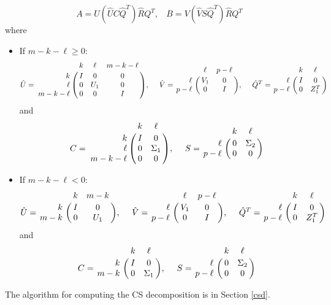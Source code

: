 \begin{equation} \label{eq-alg-4}
A = U(\hat{U}C\hat{Q}^{T})\hat{R}Q^{T}, \ \ \ \ 
B = V(\hat{V}S\hat{Q}^{T})\hat{R}Q^{T}
\end{equation}
where
\begin{itemize}
\item If $m-k-\ell \geq 0$:
	\[
                \hat{U} = \bordermatrix{ & k & \ell & m-k-\ell\cr
                \hfill k & I & 0 & 0\cr
                \hfill \ell & 0 & U_1 & 0\cr
                \hfill m-k-\ell & 0 & 0 & I}, \  \ \ \
                \hat{V} = \bordermatrix{ & \ell & p-\ell   \cr
                \hfill \ell & V_1 & 0\cr
                \hfill p-\ell & 0 & I}, \ \ \ \
                \hat{Q}^{T} = \bordermatrix{ & k & \ell   \cr
                \hfill \ell & I & 0\cr
                \hfill p-\ell & 0 & Z_1^{T}}
     \]
     and 
     \[
                C = \bordermatrix{ & k & \ell \cr
                \hfill k & I & 0 \cr
                \hfill \ell & 0 & \Sigma_{1} \cr
                \hfill m-k-\ell & 0 & 0}, \  \ \ \
                S = \bordermatrix{ & k & \ell   \cr
                \hfill \ell & 0 & \Sigma_{2}\cr
                \hfill p-\ell & 0 & 0}
    \]
\item If $m-k-\ell < 0$:
	\[
                \hat{U} = \bordermatrix{ & k & m-k \cr
                \hfill k & I & 0 \cr
                \hfill m-k & 0 & U_1}, \  \ \ \
                \hat{V} = \bordermatrix{ & \ell & p-\ell   \cr
                \hfill \ell & V_1 & 0\cr
                \hfill p-\ell & 0 & I}, \ \ \ \
                \hat{Q}^{T} = \bordermatrix{ & k & \ell   \cr
                \hfill \ell & I & 0\cr
                \hfill p-\ell & 0 & Z_1^{T}}
     \]
     and 
     \[
                C = \bordermatrix{ & k & \ell \cr
                \hfill k & I & 0 \cr
                \hfill m-k & 0 & \Sigma_{1}}, \  \ \ \
                S = \bordermatrix{ & k & \ell   \cr
                \hfill \ell & 0 & \Sigma_{2}\cr
                \hfill p-\ell & 0 & 0}
    \]
\end{itemize}

The algorithm for computing the CS decomposition is in Section \ref{csd}. 
        

